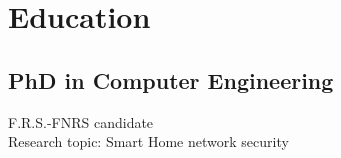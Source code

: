\documentclass[]{deedy-resume-openfont}
\begin{document}
\begin{minipage}[t]{0.60\textwidth}




\section{Education}

\subsection{PhD in Computer Engineering}
F.R.S.-FNRS candidate \\
Research topic: Smart Home network security
\sectionsep


\end{minipage}
\end{document}

